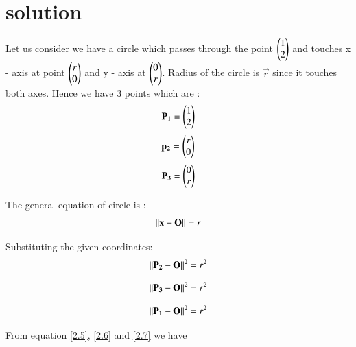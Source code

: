 \documentclass[journal,12pt,twocolumn]{IEEEtran}
\begin{document}
\section{solution}
Let us consider  we have a circle which passes through the point   $ \begin{pmatrix} 1 \\ 2 \\	\end{pmatrix} $  and touches  x - axis at point  $ \begin{pmatrix} r \\ 0 \\	\end{pmatrix} $ and y - axis  at $ \begin{pmatrix} 0 \\ r \\ \end{pmatrix} $. Radius of the circle is $\vec{r}$ since it touches both axes. Hence we have 3 points which are :
\begin{align}
\mathbf{P_{1}} = \begin{pmatrix} 1 \\ 2 \\\end{pmatrix}
\end{align}
\begin{align}
\mathbf{p_{2}} = \begin{pmatrix} r \\ 0 \\\end{pmatrix}
\end{align}
\begin{align}
\mathbf{P_{3}} = \begin{pmatrix} 0 \\ r \\\end{pmatrix} \label{2.3}
\end{align}

The general equation of circle is :
\begin{align}
\left\lVert\mathbf{x} - \mathbf{O}\right\rVert = r
\end{align}

Substituting the given coordinates:
\begin{align}
\left\lVert  \mathbf{P_2} - \mathbf{O}\right\rVert^{2} = r^{2} \label{2.5}
\end{align}

\begin{align}
\left\lVert  \mathbf{ P_3} - \mathbf{O}\right\rVert^{2} = r^{2} \label{2.6}
\end{align}


\begin{align}
\left\lVert  \mathbf{ P_1} - \mathbf{O}\right\rVert^{2} = r^{2} \label{2.7}
\end{align}

From equation \ref{2.5}, \ref{2.6} and \ref{2.7} we have 
%
%
\end{document}

